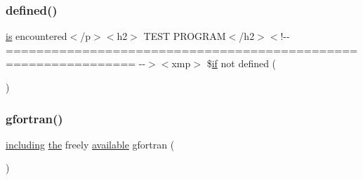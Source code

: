 \subsubsection{\texorpdfstring{defined()}{defined()}}
{\footnotesize\ttfamily \hyperlink{intro__blas1_83_8txt_a42a91df93f840595de3019ceb5d1df23}{is} encountered$<$/p$>$$<$h2$>$ T\+E\+ST P\+R\+O\+G\+R\+AM$<$/h2$>$$<$!-\/-\/ =============================================================== -\/-\/$>$$<$xmp$>$ \$\hyperlink{exit_87_8txt_a77395982f8d25581c808c40f3b634d90}{if} not defined (\begin{DoxyParamCaption}\item[{W\+H\+I\+C\+H\+\_\+\+V\+E\+R\+S\+I\+ON}]{ }\end{DoxyParamCaption})}

\mbox{\label{ufpp__overview_81_8txt_a30683df5916ed8db82df3b81ed5b49a6}} 
\subsubsection{\texorpdfstring{gfortran()}{gfortran()}}
{\footnotesize\ttfamily \hyperlink{do_87_8txt_a8a4784becc39e4ebb9a205802f11fe2d}{including} \hyperlink{M__stopwatch_83_8txt_a0f266597de2e57eb3aa964927bb30e14}{the} freely \hyperlink{M__stopwatch_83_8txt_ab4765d078d076a26632c886ad3875761}{available} gfortran (\begin{DoxyParamCaption}\item[{1}]{ }\end{DoxyParamCaption})}

\mbox{\label{ufpp__overview_81_8txt_a39133f87f838fec468dee4ec0eda67da}} 
